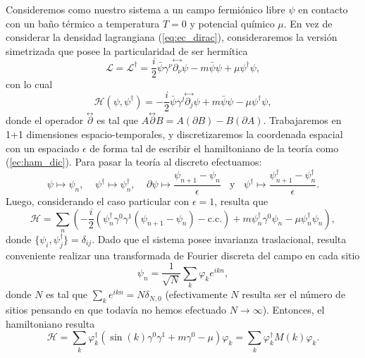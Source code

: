Consideremos como nuestro sistema a un campo fermiónico libre $\psi$ en contacto con un baño térmico a temperatura $T=0$ y potencial químico $\mu$. En vez de considerar la densidad lagrangiana (\ref{eq:ec_dirac}), consideraremos la versión simetrizada que posee la particularidad de ser hermítica\cite{Greiner:1996}
\begin{equation}
\mathcal{L}=\mathcal{L}^{\dag}=\frac{i}{2}\bar{\psi}\gamma^{\nu}\stackrel{\leftrightarrow}{\partial_{\nu}}\psi-m\bar{\psi}\psi +\mu \psi^{\dag}\psi ,
\end{equation}
con lo cual
\begin{equation}
\mathcal{H}(\psi,\psi^{\dag})=-\frac{i}{2}\bar{\psi}\gamma^{j}\stackrel{\leftrightarrow}{\partial_{j}}\psi+m\bar{\psi}\psi -\mu \psi^{\dag}\psi ,
\end{equation}
donde el operador $\stackrel{\leftrightarrow}{\partial}$ es tal que $A\stackrel{\leftrightarrow}{\partial}B=A(\partial B) - B (\partial A)$. Trabajaremos en 1+1 dimensiones espacio-temporales, y discretizaremos la coordenada espacial con un espaciado $\epsilon$  de forma tal de escribir el hamiltoniano de la teoría como (\ref{ec:ham_dic}). Para pasar la teoría al discreto efectuamos:
\begin{equation}
\psi \mapsto \psi_n,\:\:\:\:\:\psi^{\dag} \mapsto \psi^{\dag}_n,\:\:\:\:\: \partial \psi \mapsto \frac{\psi_{n+1}-\psi_n}{\epsilon}\:\:\:\: \text{y} \:\:\:\: \psi^{\dag }\mapsto \frac{\psi^{\dag}_{n+1}-\psi^{\dag}_n}{\epsilon}.
\end{equation}
Luego, considerando el caso particular con $\epsilon=1$, resulta que
\begin{equation}
\mathcal{H}=\sum_n\left(-\frac{i}{2}(\psi_n^{\dag}\gamma^0\gamma^1(\psi_{n+1}-\psi_n)-\text{c.c.})+m\psi_n^{\dag}\gamma^0\psi_n-\mu \psi_n^{\dag}\psi_n\right),
\end{equation}
donde $\lbrace\psi_i,\psi^{\dag}_j\rbrace=\delta_{ij}$. Dado que el sistema posee invarianza traslacional, resulta conveniente  realizar una transformada de Fourier discreta del campo en cada sitio
\begin{equation}
\psi_n=\frac{1}{\sqrt{N}}\sum_k\varphi_k e^{ikn},
\end{equation}
donde $N$ es tal que $\sum_k e^{ikn}=N\delta_{N,0}$ (efectivamente $N$ resulta ser el número de sitios pensando en que todavía no hemos efectuado $N\rightarrow \infty$). Entonces, el hamiltoniano resulta
\begin{equation}
\mathcal{H}=\sum_k \varphi_k^{\dag}\left(\sin(k)\gamma^0\gamma^1+m\gamma^0-\mu \right)\varphi_k=\sum_k \varphi_k^{\dag}M(k)\varphi_k.
\end{equation}
